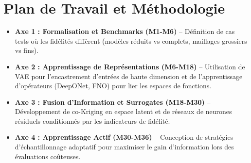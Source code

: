 \documentclass[a4paper,11pt]{article}
\begin{document}
\section{Plan de Travail et Méthodologie}
\begin{itemize}
    \item \textbf{Axe 1 : Formalisation et Benchmarks (M1-M6)} -- Définition de cas tests où les fidélités diffèrent (modèles réduits vs complets, maillages grossiers vs fins).
    \item \textbf{Axe 2 : Apprentissage de Représentations (M6-M18)} -- Utilisation de VAE pour l'encastrement d'entrées de haute dimension et de l'apprentissage d'opérateurs (DeepONet, FNO) pour lier les espaces de fonctions.
    \item \textbf{Axe 3 : Fusion d'Information et Surrogates (M18-M30)} -- Développement de co-Kriging en espace latent et de réseaux de neurones résiduels conditionnés par les indicateurs de fidélité.
    \item \textbf{Axe 4 : Apprentissage Actif (M30-M36)} -- Conception de stratégies d'échantillonnage adaptatif pour maximiser le gain d'information lors des évaluations coûteuses.
\end{itemize}
\end{document}
